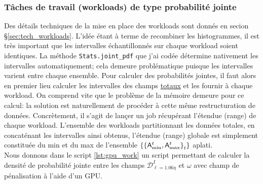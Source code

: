 \documentclass[13pt, a4paper]{extarticle}
\begin{document}
\subsubsection{Tâches de travail (workloads) de type probabilité jointe}\label{sec:workloads}
\noindent Des détails techniques de la mise en place des workloads sont donnés
en secion \S \ref{sec:tech_workloads}. 
L'idée étant à terme de recombiner les histogrammes, il est très important
que les intervalles échantillonnés sur chaque workload soient identiques. La méthode
\texttt{Stats.joint\_pdf} que j'ai codée détermine nativement les intervalles automatiquement;
cela demeure problématique puisque les intervalles varient entre chaque ensemble.
Pour calculer des probabilités jointes, il faut alors en premier lieu calculer
les intervalles des champs \ul{totaux} et les fournir à chaque workload. On comprend
vite que le problème de la mémoire demeure pour ce calcul: la solution
est naturellement de procéder à cette même restructuration de données. Concrètement,
il s'agit de lançer un job récupérant l'étendue (range) de chaque workload.
L'ensemble des workloads partitionnant les données totales, en concaténant les intervalles
ainsi obtenus, l'étendue (range) globale est simplement constituée du min et du max de l'ensemble
$\left\{\left\{\mathsf{A}_{\text{min}}^t,\mathsf{A}_{\text{max}}^t\right\}_t\right\}$ aplati. \\

\noindent Nous donnons dans le script \ref{lst:gpu_work} un script permettant
de calculer la densité de probabilité jointe entre les champs $\mathscr{D}^{I}_{\ell=1.06\eta}$ et $\omega$
avec champ de pénalisation à l'aide d'un GPU.

\vspace{.2cm}
\end{document}
